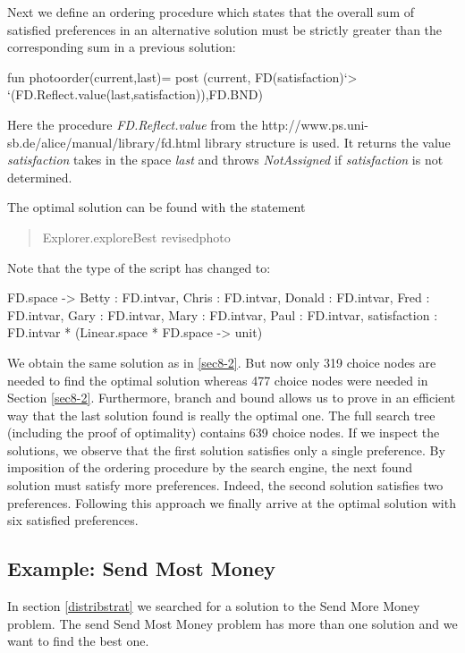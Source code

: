 \documentclass[a4paper,halfparskip]{scrartcl}
\begin{document}
Next we define an ordering procedure which states that the overall 
sum of satisfied preferences in an alternative solution must be 
strictly greater than the corresponding sum in a previous solution:

\begin{myverbatim}
fun photoorder(current,last)=
               post (current, FD(satisfaction)`> 
            `(FD.Reflect.value(last,satisfaction)),FD.BND)
\end{myverbatim}


Here the procedure \emph{FD.Reflect.value} from the
\htmladdnormallink{\textcolor{blue}{FD.Reflect}}
{http://www.ps.uni-sb.de/alice/manual/library/fd.html}
library structure is used.
It returns the value \emph{satisfaction} takes in the space \emph{last} and
throws \emph{NotAssigned} if \emph{satisfaction} is not determined.

The optimal solution can be found with the statement
\begin{quote}
    Explorer.exploreBest revisedphoto
\end{quote}
Note that the type of the script has changed to:
\begin{myverbatim}
FD.space ->
      {Betty : FD.intvar, Chris : FD.intvar, Donald : FD.intvar,
       Fred : FD.intvar, Gary : FD.intvar, Mary : FD.intvar, Paul : FD.intvar,
       satisfaction : FD.intvar} * (Linear.space * FD.space -> unit)
\end{myverbatim}


We obtain the same solution as in \ref{sec8-2}. But now only 319 choice nodes 
are needed to find the optimal solution whereas 477 choice nodes 
were needed in Section \ref{sec8-2}. Furthermore, branch and bound allows 
us to prove in an efficient way that the last solution found is 
really the optimal one. The full search tree (including the proof 
of optimality) contains 639 choice nodes. If we inspect 
the solutions, we observe that the first solution satisfies only a 
single preference. By imposition of the ordering procedure by the 
search engine, the next found solution must satisfy more preferences. 
Indeed, the second solution satisfies two preferences. Following 
this approach we finally arrive at the optimal solution with six 
satisfied preferences.


\newpage
\subsection{Example: Send Most Money}
In section \ref{distribstrat} we searched for a solution to the
Send More Money problem. The send Send Most Money problem
has more than one solution and we want to find the best one.
\end{document}
